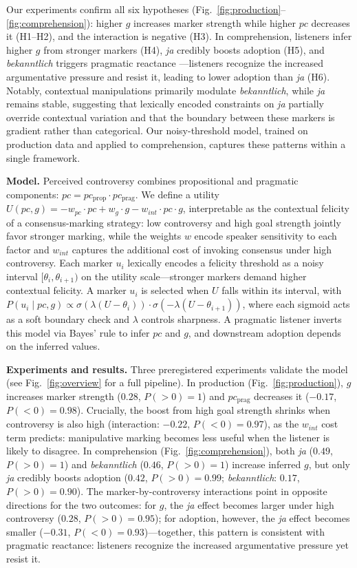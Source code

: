 \documentclass[12pt]{article}
\begin{document}
Our experiments confirm all six hypotheses (Fig.~\ref{fig:production}--\ref{fig:comprehension}): higher $g$ increases marker strength while higher $pc$ decreases it (H1--H2), and the interaction is negative (H3). In comprehension, listeners infer higher $g$ from stronger markers (H4), \textit{ja} credibly boosts adoption (H5), and \textit{bekanntlich} triggers pragmatic reactance \citep{Brehm1966-BREATO-2}---listeners recognize the increased argumentative pressure and resist it, leading to lower adoption than \textit{ja} (H6). Notably, contextual manipulations primarily modulate \textit{bekanntlich}, while \textit{ja} remains stable, suggesting that lexically encoded constraints on \textit{ja} partially override contextual variation and that the boundary between these markers is gradient rather than categorical. Our noisy-threshold model, trained on production data and applied to comprehension, captures these patterns within a single framework.

\textbf{Model.}
Perceived controversy combines propositional and pragmatic components: $pc = pc_{\text{prop}} \cdot pc_{\text{prag}}$. We define a utility $U(pc, g) = -w_{pc} \cdot pc + w_g \cdot g - w_{int} \cdot pc \cdot g$, interpretable as the contextual felicity of a consensus-marking strategy: low controversy and high goal strength jointly favor stronger marking, while the weights $w$ encode speaker sensitivity to each factor and $w_{int}$ captures the additional cost of invoking consensus under high controversy. Each marker $u_i$ lexically encodes a felicity threshold as a noisy interval $[\theta_i, \theta_{i+1})$ on the utility scale---stronger markers demand higher contextual felicity. A marker $u_i$ is selected when $U$ falls within its interval, with $P(u_i \mid pc, g) \propto \sigma(\lambda(U - \theta_i)) \cdot \sigma(-\lambda(U - \theta_{i+1}))$, where each sigmoid acts as a soft boundary check and $\lambda$ controls sharpness. A pragmatic listener inverts this model via Bayes' rule to infer $pc$ and $g$, and downstream adoption depends on the inferred values.

\textbf{Experiments and results.}
Three preregistered experiments validate the model (see Fig.~\ref{fig:overview} for a full pipeline).
In production (Fig.~\ref{fig:production}), $g$ increases marker strength ($0.28$, $P(>0) = 1$) and $pc_{\text{prag}}$ decreases it ($-0.17$, $P(<0) = 0.98$). Crucially, the boost from high goal strength shrinks when controversy is also high (interaction: $-0.22$, $P(<0) = 0.97$), as the $w_{int}$ cost term predicts: manipulative marking becomes less useful when the listener is likely to disagree.
In comprehension (Fig.~\ref{fig:comprehension}), both \textit{ja} ($0.49$, $P(>0) = 1$) and \textit{bekanntlich} ($0.46$, $P(>0) = 1$) increase inferred $g$, but only \textit{ja} credibly boosts adoption ($0.42$, $P(>0) = 0.99$; \textit{bekanntlich}: $0.17$, $P(>0) = 0.90$). The marker-by-controversy interactions point in opposite directions for the two outcomes: for $g$, the \textit{ja} effect becomes larger under high controversy ($0.28$, $P(>0) = 0.95$); for adoption, however, the \textit{ja} effect becomes smaller ($-0.31$, $P(<0) = 0.93$)---together, this pattern is consistent with pragmatic reactance: listeners recognize the increased argumentative pressure yet resist it.
\end{document}
